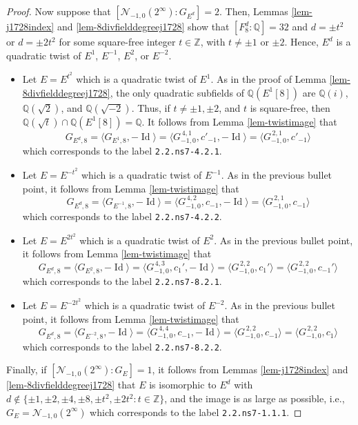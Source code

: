 \documentclass[11pt]{amsart}
\theoremstyle{definition}
\newcommand{\Q}{\mathbb Q}
\newcommand{\Z}{\mathbb Z}
\begin{document}
\begin{proof}
 Now suppose that $[\mathcal{N}_{-1,0}(2^{\infty}): G_{E^d}]=2$. Then, Lemmas \ref{lem-j1728index} and \ref{lem-8divfielddegreej1728} show that $[F_8^d:\Q]=32$ and $d=\pm t^2$ or $d=\pm 2t^2$ for some square-free integer $t\in\Z$, with $t\neq \pm 1$ or $\pm 2$. Hence, $E^d$ is a quadratic twist of $E^1$, $E^{-1}$, $E^{2}$, or $E^{-2}$.
 \begin{itemize}
     \item Let $E=E^{t^2}$ which is a quadratic twist of $E^1$. As in the proof of Lemma \ref{lem-8divfielddegreej1728}, the only quadratic subfields of $\Q(E^1[8])$ are $\Q(i)$, $\Q(\sqrt{2})$, and $\Q(\sqrt{-2})$. Thus, if $t\neq \pm 1, \pm 2$, and $t$ is square-free, then $\Q(\sqrt{t})\cap \Q(E^1[8])=\Q$. It follows from Lemma \ref{lem-twistimage} that 
     $$G_{E^d,8} = \langle G_{E^1,8}, -\operatorname{Id}\rangle = \langle G^{\, 4,1}_{-1,0},c'_{-1},-\operatorname{Id}\rangle = \langle G^{\, 2,1}_{-1,0},c'_{-1}\rangle$$
     which corresponds to the label \texttt{2.2.ns7-4.2.1}.
     \item Let $E=E^{-t^2}$ which is a quadratic twist of $E^{-1}$. As in the previous bullet point, it follows from Lemma \ref{lem-twistimage} that 
     $$G_{E^d,8} = \langle G_{E^{-1},8}, -\operatorname{Id}\rangle = \langle G^{\, 4,2}_{-1,0},c_{-1},-\operatorname{Id}\rangle = \langle G^{\, 2,1}_{-1,0},c_{-1}\rangle$$
     which corresponds to the label \texttt{2.2.ns7-4.2.2}.
     \item Let $E=E^{2t^2}$ which is a quadratic twist of $E^{2}$. As in the previous bullet point, it follows from Lemma \ref{lem-twistimage} that 
     $$G_{E^d,8} = \langle G_{E^{2},8}, -\operatorname{Id}\rangle = \langle G^{\, 4,3}_{-1,0},c_{1}',-\operatorname{Id}\rangle = \langle G^{\, 2,2}_{-1,0},c_{1}'\rangle= \langle G^{\, 2,2}_{-1,0},c_{-1}'\rangle$$
     which corresponds to the label \texttt{2.2.ns7-8.2.1}.
     \item Let $E=E^{-2t^2}$ which is a quadratic twist of $E^{-2}$. As in the previous bullet point, it follows from Lemma \ref{lem-twistimage} that 
     $$G_{E^d,8} = \langle G_{E^{-2},8}, -\operatorname{Id}\rangle = \langle G^{\, 4,4}_{-1,0},c_{-1},-\operatorname{Id}\rangle = \langle G^{\, 2,2}_{-1,0},c_{-1}\rangle= \langle G^{\, 2,2}_{-1,0},c_{1}\rangle$$
     which corresponds to the label \texttt{2.2.ns7-8.2.2}.
 \end{itemize}
 Finally, if $[\mathcal{N}_{-1,0}(2^{\infty}): G_E]=1$, it follows from Lemmas \ref{lem-j1728index} and \ref{lem-8divfielddegreej1728} that $E$  is isomorphic to $E^d$ with $d\not\in \{\pm 1,\pm 2,\pm 4,\pm 8, \pm t^2,\pm 2t^2 : t \in \Z\}$, and the image is as large as possible, i.e., $G_E=\mathcal{N}_{-1,0}(2^{\infty})$ which corresponds to the label \texttt{2.2.ns7-1.1.1}.
\end{proof}
\end{document}
